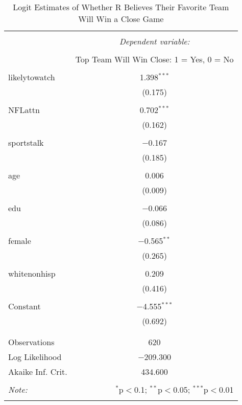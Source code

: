 \documentclass{article}
\begin{document}

\begin{table}[!htbp] \centering 
  \caption{Logit Estimates of Whether R Believes Their Favorite Team Will Win a Close Game} 
  \label{} 
\begin{tabular}{@{\extracolsep{5pt}}lc} 
\\[-1.8ex]\hline 
\hline \\[-1.8ex] 
 & \multicolumn{1}{c}{\textit{Dependent variable:}} \\ 
\cline{2-2} 
\\[-1.8ex] & Top Team Will Win Close: 1 = Yes, 0 = No \\ 
\hline \\[-1.8ex] 
 likelytowatch & 1.398$^{***}$ \\ 
  & (0.175) \\ 
  & \\ 
 NFLattn & 0.702$^{***}$ \\ 
  & (0.162) \\ 
  & \\ 
 sportstalk & $-$0.167 \\ 
  & (0.185) \\ 
  & \\ 
 age & 0.006 \\ 
  & (0.009) \\ 
  & \\ 
 edu & $-$0.066 \\ 
  & (0.086) \\ 
  & \\ 
 female & $-$0.565$^{**}$ \\ 
  & (0.265) \\ 
  & \\ 
 whitenonhisp & 0.209 \\ 
  & (0.416) \\ 
  & \\ 
 Constant & $-$4.555$^{***}$ \\ 
  & (0.692) \\ 
  & \\ 
\hline \\[-1.8ex] 
Observations & 620 \\ 
Log Likelihood & $-$209.300 \\ 
Akaike Inf. Crit. & 434.600 \\ 
\hline 
\hline \\[-1.8ex] 
\textit{Note:}  & \multicolumn{1}{r}{$^{*}$p$<$0.1; $^{**}$p$<$0.05; $^{***}$p$<$0.01} \\ 
\normalsize 
\end{tabular} 
\end{table}
\end{document}
